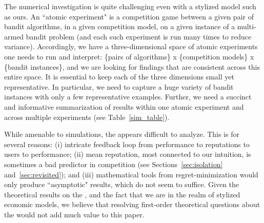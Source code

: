 The numerical investigation is quite challenging even with a stylized model such as ours. An ``atomic experiment" is a competition game between a given pair of bandit algorithms, in a given competition model, on a given instance of a multi-armed bandit problem (and each such experiment is run many times to reduce variance).
Accordingly, we have a three-dimensional space of atomic experiments one needs to run and interpret: \{pairs of algorithms\} x \{competition models\} x \{bandit instances\}, and we are looking for findings that are consistent across this entire space. It is essential to keep each of the three dimensions small yet representative. In particular, we need to capture a huge variety of bandit instances with only a few representative examples. Further, we need a succinct and informative summarization of results within one atomic experiment and across multiple experiments (\eg see Table~\ref{sim_table}).


While amenable to simulations, the \ExptsModel appears difficult to analyze. This is for several reasons:
%
(i) intricate feedback loop from performance to reputations to users to performance;
%
(ii) mean reputation, most connected to our intuition, is sometimes a bad predictor in competition (see Sections~\ref{sec:isolation} and~\ref{sec:revisited}); and
%
(iii)
mathematical tools from regret-minimization would only produce ``asymptotic" results, which do not seem to suffice. Given the theoretical results on the \TheoryModel, and the fact that we are in the realm of stylized economic models, we believe that resolving first-order theoretical questions about the \ExptsModel would not add much value to this paper.



